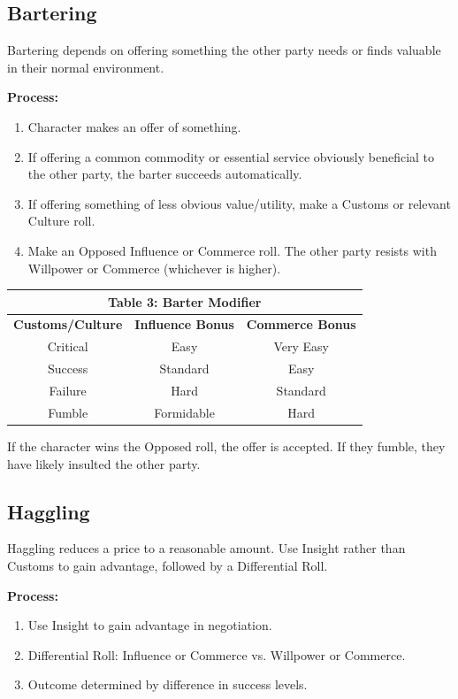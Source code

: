 \documentclass[10pt]{article}
\begin{document}
\subsection{Bartering}
\label{sec:bartering}

Bartering depends on offering something the other party needs or finds valuable in their normal environment.

\textbf{Process:}
\begin{enumerate}
    \item Character makes an offer of something.
    \item If offering a common commodity or essential service obviously beneficial to the other party, the barter succeeds automatically.
    \item If offering something of less obvious value/utility, make a Customs or relevant Culture roll.
    \item Make an Opposed Influence or Commerce roll. The other party resists with Willpower or Commerce (whichever is higher).
\end{enumerate}

\begin{longtable}[c]{|c|c|c|}
\hline
\multicolumn{3}{|c|}{\textbf{Table 3: Barter Modifier}} \\
\hline
\textbf{Customs/Culture} & \textbf{Influence Bonus} & \textbf{Commerce Bonus} \\
\hline
Critical & Easy & Very Easy \\
\hline
Success & Standard & Easy \\
\hline
Failure & Hard & Standard \\
\hline
Fumble & Formidable & Hard \\
\hline
\end{longtable}

If the character wins the Opposed roll, the offer is accepted. If they fumble, they have likely insulted the other party.

\subsection{Haggling}
\label{sec:haggling}

Haggling reduces a price to a reasonable amount. Use Insight rather than Customs to gain advantage, followed by a Differential Roll.

\textbf{Process:}
\begin{enumerate}
    \item Use Insight to gain advantage in negotiation.
    \item Differential Roll: Influence or Commerce vs. Willpower or Commerce.
    \item Outcome determined by difference in success levels.
\end{enumerate}
\end{document}
